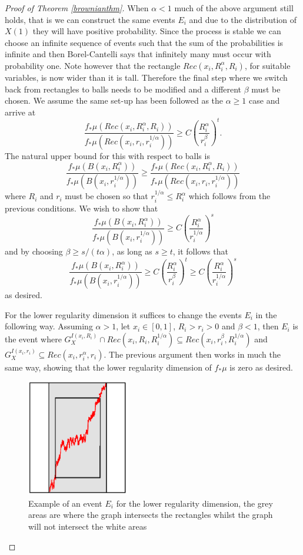 \begin{proof}[Proof of Theorem \ref{brownianthm}]
When $\alpha < 1$ much of the above argument still holds, that is we can construct the same events $E_i$ and due to the distribution of $X(1)$ they will have positive probability. Since the process is stable we can choose an infinite sequence of events such that the sum of the probabilities is infinite and then Borel-Cantelli says that infinitely many must occur with probability one. Note however that the rectangle $Rec(x_i, R_i^{\alpha}, R_i)$, for suitable variables, is now wider than it is tall. Therefore the final step where we switch back from rectangles to balls needs to be modified and a different $\beta$ must be chosen. We assume the same set-up has been followed as the $\alpha \ge 1$ case and arrive at
\[
\frac{f_*\mu(Rec(x_i,R_i^{\alpha}, R_i))}{f_*\mu(Rec(x_i,r_i, r_i^{1/\alpha}))} \ge C \left( \frac{R_i^{\alpha}}{r_i^{\beta}} \right) ^t.
\]
The natural upper bound for this with respect to balls is 
\[
\frac{f_*\mu(B(x_i, R_i^{\alpha}))}{f_*\mu(B(x_i,r_i^{1/\alpha}))} \ge \frac{f_*\mu(Rec(x_i,R_i^{\alpha}, R_i))}{f_*\mu(Rec(x_i,r_i, r_i^{1/\alpha}))}
\]
where $R_i$ and $r_i$ must be chosen so that $r_i^{1/\alpha}  \le R_i^{\alpha}$ which follows from the previous conditions. We wish to show that 
\[
\frac{f_*\mu(B(x_i, R_i^{\alpha}))}{f_*\mu(B(x_i,r_i^{1/\alpha}))} \ge C \left( \frac{R_i^{\alpha}}{r_i^{1/\alpha}} \right)^s
\]
and by choosing $\beta \ge s/ (t\alpha)$, as long as $s \ge t$, it follows that
\[
\frac{f_*\mu(B(x_i, R_i^{\alpha}))}{f_*\mu(B(x_i,r_i^{1/\alpha}))} \ge C \left( \frac{R_i^{\alpha}}{r_i^{\beta}} \right) ^t \ge C \left(\frac{R_i^{\alpha}}{r_i^{1/\alpha}}\right)^s
\]
as desired.

\newpage
For the lower regularity dimension it suffices to change the events $E_i$ in the following way. Assuming $\alpha>1$, let $x_i \in [0,1]$, $R_i > r_i > 0$ and $\beta < 1$, then $E_i$ is the event where $G_X^{I(x_i, R_i)} \cap Rec(x_i,R_i,R_i^{1/\alpha}) \subseteq Rec(x_i, r_i^{\beta}, R_i^{1/\alpha})$ and $G_X^{I(x_i, r_i)} \subseteq Rec(x_i, r_i^{\alpha}, r_i)$. The previous argument then works in much the same way, showing that the lower regularity dimension of $f_*\mu$ is zero as desired.

\begin{figure}[tbp]
	\centering
	\includegraphics[width=0.4\textwidth]{pics/ch-brownian/rectangles.png}
	\caption{Example of an event $E_i$ for the lower regularity dimension, the grey areas are where the graph intersects the rectangles whilst the graph will not intersect the white areas}
	\label{brownian_event_lower}
\end{figure}


\end{proof}



